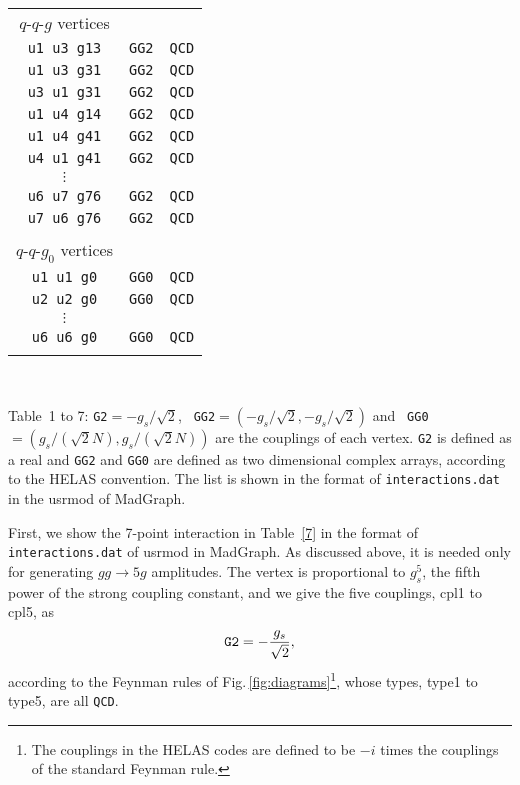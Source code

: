 \documentclass[a4paper,11pt]{article}
\begin{document}
\begin{table}
\begin{center}
\begin{tabular}{ccc}
$q$-$q$-$g$ vertices\\
{\tt u1 u3 g13}&{\tt GG2}&{\tt QCD}\\
{\tt u1 u3 g31}&{\tt GG2}&{\tt QCD}\\
{\tt u3 u1 g31}&{\tt GG2}&{\tt QCD}\\
{\tt u1 u4 g14}&{\tt GG2}&{\tt QCD}\\
{\tt u1 u4 g41}&{\tt GG2}&{\tt QCD}\\
{\tt u4 u1 g41}&{\tt GG2}&{\tt QCD}\\
$\vdots$&&\\
{\tt u6 u7 g76}&{\tt GG2}&{\tt QCD}\\
{\tt u7 u6 g76}&{\tt GG2}&{\tt QCD}\\\\
\hspace{1.5em}$q$-$q$-$g_0$ vertices\\
{\tt u1 u1 g0}&{\tt GG0}&{\tt QCD}\\
{\tt u2 u2 g0}&{\tt GG0}&{\tt QCD}\\
$\vdots$&&\\
{\tt u6 u6 g0}&{\tt GG0}&{\tt QCD}\\\\
\hline
\hline
\end{tabular}\\
 \vspace{1em}
 \begin{flushleft}
Table~1 to 7: {\tt G2}$=-g_s/\sqrt{2}$, {\tt
 GG2}$=(-g_s/\sqrt{2},-g_s/\sqrt{2})$ and {\tt
 GG0}$=(g_s/(\sqrt{2}N),g_s/(\sqrt{2}N))$
 are the couplings of each
 vertex. {\tt G2} is defined as a real and {\tt GG2} and {\tt GG0} are
  defined as two dimensional complex arrays, according to the HELAS convention. The list
  is shown in the format of {\tt interactions.dat} in the usrmod of MadGraph\cite{MG/ME}.
  \end{flushleft}
 \label{tb:interactions}
\end{center}
\end{table}

First, we show the 7-point interaction in Table~\ref{7} in the format of
 {\tt
interactions.dat} of usrmod in MadGraph\cite{MG/ME}. As discussed above,
 it is needed  only for generating $gg\rightarrow 5g$ amplitudes. The vertex is
proportional to $g_s^5$, the fifth power of the strong coupling constant, and
we give the five couplings, cpl1 to cpl5, as
\begin{equation}
 {\tt G2} =-\frac{g_s}{\sqrt{2}},
\end{equation}
according to the Feynman rules of Fig.\,\ref{fig:diagrams}\footnote{The
couplings in the HELAS codes are defined to be $-i$ times the couplings
of the standard Feynman rule.}, whose
types, type1 to type5, are all {\tt QCD}.
\end{document}

